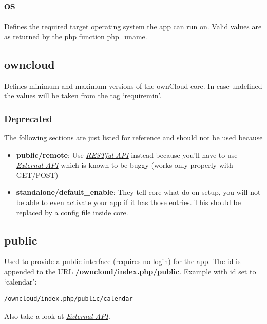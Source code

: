 \documentclass[letterpaper,10pt,english]{sphinxmanual}
\begin{document}
\subsection{os}
\label{app/info:os}
Defines the required target operating system the app can run on. Valid values are as returned by the php function \href{http://php.net/manual/en/function.php-uname.php}{php\_uname}.


\subsection{owncloud}
\label{app/info:owncloud}
Defines minimum and maximum versions of the ownCloud core. In case undefined the values will be taken from the tag `requiremin'.


\subsubsection{Deprecated}
\label{app/info:deprecated}
The following sections are just listed for reference and should not be used because
\begin{itemize}
\item {} 
\textbf{public/remote}: Use {\hyperref[app/api::doc]{\emph{\emph{RESTful API}}}} instead because you'll have to use {\hyperref[core/externalapi::doc]{\emph{\emph{External API}}}} which is known to be buggy (works only properly with GET/POST)

\item {} 
\textbf{standalone/default\_enable}: They tell core what do on setup, you will not be able to even activate your app if it has those entries. This should be replaced by a config file inside core.

\end{itemize}


\subsection{public}
\label{app/info:public}
Used to provide a public interface (requires no login) for the app. The id is appended to the URL \textbf{/owncloud/index.php/public}. Example with id set to `calendar':

\begin{Verbatim}[commandchars=\\\{\}]
/owncloud/index.php/public/calendar
\end{Verbatim}

Also take a look at {\hyperref[core/externalapi::doc]{\emph{\emph{External API}}}}.
\end{document}
